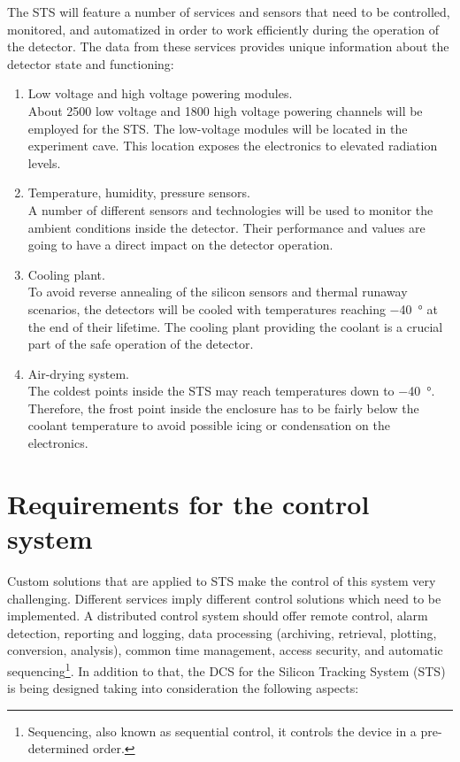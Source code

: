 The \gls{STS} will feature a number of services and sensors that need to be controlled, monitored, and automatized in order to work efficiently during the operation of the detector. The data from these services provides unique information about the detector state and functioning:
\begin{enumerate}
    \item Low voltage and high voltage powering modules.\\
    About 2500 low voltage and 1800 high voltage powering channels will be employed for the \gls{STS}. The low-voltage modules will be located in the experiment cave. This location exposes the electronics to elevated radiation levels. 
    \item Temperature, humidity, pressure sensors.\\
    A number of different sensors and technologies will be used to monitor the ambient conditions inside the detector. Their performance and values are going to have a direct impact on the detector operation.
    \item Cooling plant.\\
    To avoid reverse annealing of the silicon sensors and thermal runaway scenarios, the detectors will be cooled with temperatures reaching \SI{-40}{\degree} at the end of their lifetime. The cooling plant providing the coolant is a crucial part of the safe operation of the detector.
    \item Air-drying system.\\
    The coldest points inside the \gls{STS} may reach temperatures down to \SI{-40}{\degree}. Therefore, the frost point inside the enclosure has to be fairly below the coolant temperature to avoid possible icing or condensation on the electronics.
 \end{enumerate}



\section{Requirements for the control system}
\label{sys:req}
Custom solutions that are applied to \gls{STS} make the control of this system very challenging. Different services imply different control solutions which need to be implemented.
A distributed control system should offer remote control, alarm detection, reporting and logging, data processing (archiving, retrieval, plotting, conversion, analysis), common time management, access security, and automatic sequencing\footnote{Sequencing, also known as sequential control, it controls the device in a pre-determined order.}.
In addition to that, the \gls{DCS} for the Silicon Tracking System (\gls{STS}) is being designed taking into consideration the following aspects:

